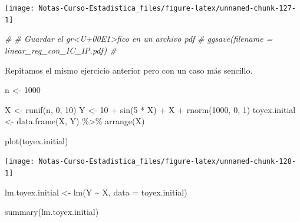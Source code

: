 \documentclass[
  12pt,
]{book}
\newenvironment{Shaded}{\begin{snugshade}}{\end{snugshade}}
\newcommand{\AttributeTok}[1]{\textcolor[rgb]{0.77,0.63,0.00}{#1}}
\newcommand{\CommentTok}[1]{\textcolor[rgb]{0.56,0.35,0.01}{\textit{#1}}}
\newcommand{\DecValTok}[1]{\textcolor[rgb]{0.00,0.00,0.81}{#1}}
\newcommand{\FunctionTok}[1]{\textcolor[rgb]{0.00,0.00,0.00}{#1}}
\newcommand{\NormalTok}[1]{#1}
\newcommand{\OtherTok}[1]{\textcolor[rgb]{0.56,0.35,0.01}{#1}}
\newcommand{\SpecialCharTok}[1]{\textcolor[rgb]{0.00,0.00,0.00}{#1}}
\begin{document}
\begin{center}\texttt{[image: Notas-Curso-Estadistica\_files/figure-latex/unnamed-chunk-127-1]} \end{center}

\begin{Shaded}
\begin{Highlighting}[]
\CommentTok{\# \# Guardar el gr\textless{}U+00E1\textgreater{}fico en un archivo pdf}
\CommentTok{\# ggsave(filename = \textquotesingle{}linear\_reg\_con\_IC\_IP.pdf\textquotesingle{}) \#}
\end{Highlighting}
\end{Shaded}

Repitamos el mismo ejercicio anterior pero con un caso más sencillo.

\begin{Shaded}
\begin{Highlighting}[]
\NormalTok{n }\OtherTok{\textless{}{-}} \DecValTok{1000}

\NormalTok{X }\OtherTok{\textless{}{-}} \FunctionTok{runif}\NormalTok{(n, }\DecValTok{0}\NormalTok{, }\DecValTok{10}\NormalTok{)}
\NormalTok{Y }\OtherTok{\textless{}{-}} \DecValTok{10} \SpecialCharTok{+} \FunctionTok{sin}\NormalTok{(}\DecValTok{5} \SpecialCharTok{*}\NormalTok{ X) }\SpecialCharTok{+}\NormalTok{ X }\SpecialCharTok{+} \FunctionTok{rnorm}\NormalTok{(}\DecValTok{1000}\NormalTok{, }\DecValTok{0}\NormalTok{, }\DecValTok{1}\NormalTok{)}
\NormalTok{toyex.initial }\OtherTok{\textless{}{-}} \FunctionTok{data.frame}\NormalTok{(X, Y) }\SpecialCharTok{\%\textgreater{}\%}
    \FunctionTok{arrange}\NormalTok{(X)}

\FunctionTok{plot}\NormalTok{(toyex.initial)}
\end{Highlighting}
\end{Shaded}

\begin{center}\texttt{[image: Notas-Curso-Estadistica\_files/figure-latex/unnamed-chunk-128-1]} \end{center}

\begin{Shaded}
\begin{Highlighting}[]
\NormalTok{lm.toyex.initial }\OtherTok{\textless{}{-}} \FunctionTok{lm}\NormalTok{(Y }\SpecialCharTok{\textasciitilde{}}\NormalTok{ X, }\AttributeTok{data =}\NormalTok{ toyex.initial)}

\FunctionTok{summary}\NormalTok{(lm.toyex.initial)}
\end{Highlighting}
\end{Shaded}
\end{document}
